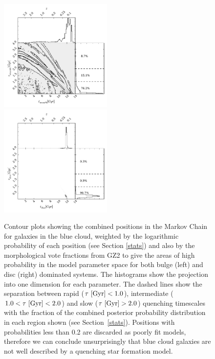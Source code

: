 \begin{figure}
\includegraphics[width=0.4975\textwidth]{morphology/blue_smooth.pdf}
\includegraphics[width=0.4975\textwidth]{morphology/blue_disc.pdf}
\caption[Population densities of blue smooth and disc galaxies]{Contour plots showing the combined positions in the Markov Chain for galaxies in the blue cloud, weighted by the logarithmic probability of each position (see Section \ref{stats}) and also by the morphological vote fractions from GZ2 to give the areas of high probability in the model parameter space for both bulge (left) and disc (right) dominated systems. The histograms show the projection into one dimension for each parameter. The dashed lines show the separation between rapid ($\tau ~\rm{[Gyr]} < 1.0$), intermediate ($1.0 < \tau ~\rm{[Gyr]} < 2.0$) and slow ($\tau ~\rm{[Gyr]} > 2.0$) quenching timescales with the fraction of the combined posterior probability distribution in each region shown (see Section~\ref{stats}). Positions with probabilities less than 0.2 are discarded as poorly fit models, therefore we can conclude unsurprisingly that blue cloud galaxies are not well described by a quenching star formation model. }
\label{blue_c}
\end{figure}

